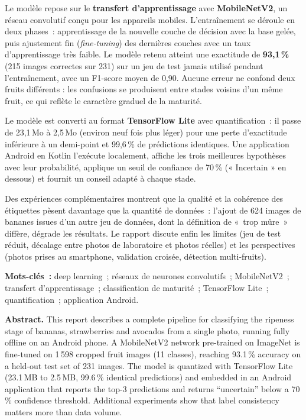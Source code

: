 Le modèle repose sur le \textbf{transfert d’apprentissage} avec \textbf{MobileNetV2}, un réseau convolutif conçu pour les appareils mobiles. L’entraînement se déroule en deux phases~: apprentissage de la nouvelle couche de décision avec la base gelée, puis ajustement fin (\emph{fine-tuning}) des dernières couches avec un taux d’apprentissage très faible. Le modèle retenu atteint une exactitude de \textbf{93,1\,\%} (215 images correctes sur 231) sur un jeu de test jamais utilisé pendant l’entraînement, avec un F1-score moyen de 0,90. Aucune erreur ne confond deux fruits différents : les confusions se produisent entre stades voisins d’un même fruit, ce qui reflète le caractère graduel de la maturité.

Le modèle est converti au format \textbf{TensorFlow Lite} avec quantification~: il passe de 23,1\,Mo à 2,5\,Mo (environ neuf fois plus léger) pour une perte d’exactitude inférieure à un demi-point et 99,6\,\% de prédictions identiques. Une application Android en Kotlin l’exécute localement, affiche les trois meilleures hypothèses avec leur probabilité, applique un seuil de confiance de 70\,\% (« Incertain » en dessous) et fournit un conseil adapté à chaque stade.

Des expériences complémentaires montrent que la qualité et la cohérence des étiquettes pèsent davantage que la quantité de données~: l’ajout de 624 images de bananes issues d’un autre jeu de données, dont la définition de «~trop mûre~» diffère, dégrade les résultats. Le rapport discute enfin les limites (jeu de test réduit, décalage entre photos de laboratoire et photos réelles) et les perspectives (photos prises au smartphone, validation croisée, détection multi-fruits).

\vspace{4pt}
\noindent\textbf{Mots-clés~:} deep learning~; réseaux de neurones convolutifs~; MobileNetV2~; transfert d’apprentissage~; classification de maturité~; TensorFlow Lite~; quantification~; application Android.

\vspace{10pt}
\begin{absbox}
\textbf{Abstract.} This report describes a complete pipeline for classifying the ripeness stage of bananas, strawberries and avocados from a single photo, running fully offline on an Android phone. A MobileNetV2 network pre-trained on ImageNet is fine-tuned on 1\,598 cropped fruit images (11 classes), reaching 93.1\,\% accuracy on a held-out test set of 231 images. The model is quantized with TensorFlow Lite (23.1\,MB to 2.5\,MB, 99.6\,\% identical predictions) and embedded in an Android application that reports the top-3 predictions and returns ``uncertain'' below a 70\,\% confidence threshold. Additional experiments show that label consistency matters more than data volume.
\end{absbox}
\clearpage
